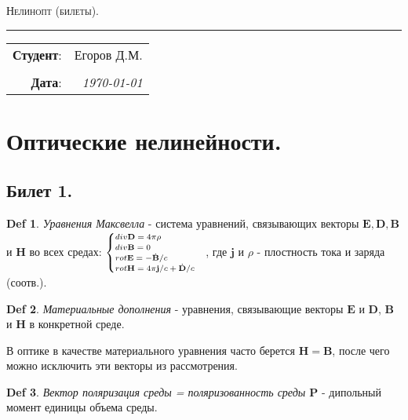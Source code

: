 \documentclass[a4paper,12pt]{article}
\theoremstyle{definition} %
\theoremstyle{definition} %
\newtheorem{Def}{Def}[section]
\theoremstyle{remark} %
\begin{document}
\begin{center}
	\LARGE \textsc{Нелинопт (билеты).}
\end{center}

\hrule

\phantom{42}

\begin{flushright}
	\begin{tabular}{rr}
		\textbf{Студент}: 
		& Егоров Д.М. \\
		&\\
		\textbf{Дата}: &
		\textit{\today}\\
	\end{tabular}
\end{flushright}

\thispagestyle{empty}
\tableofcontents
\newpage


\section{Оптические нелинейности.}
\subsection{Билет 1.}

\begin{Def}
	\textit{Уравнения Максвелла} - система уравнений, связывающих векторы $\mathbf{E}, \mathbf{D}, \mathbf{B}$ и $\mathbf{H}$  во всех средах: $\scriptsize
	\begin{cases}
		div \mathbf{D} = 4 \pi \rho \\
		div \mathbf{B} = 0 \\
		rot \mathbf{E} = -\dot{\mathbf{B}}/c \\
		rot \mathbf{H} = 4\pi \mathbf{j}/c + \dot{\mathbf{D}}/c
	\end{cases}$, где $\mathbf{j}$ и $\rho$ - плостность тока и заряда (соотв.).
\end{Def}
\begin{Def}
	\textit{Материальные дополнения} - уравнения, связывающие векторы $\mathbf{E}$ и $\mathbf{D}$, $\mathbf{B}$ и $\mathbf{H}$ в конкретной среде.
\end{Def}

	В оптике в качестве материального уравнения часто берется $\mathbf{H}=\mathbf{B}$, после чего можно исключить эти векторы из рассмотрения.

\begin{Def}
	\textit{Вектор поляризация среды = поляризованность среды $\mathbf{P}$} - дипольный момент единицы объема среды.
\end{Def}
\end{document}
